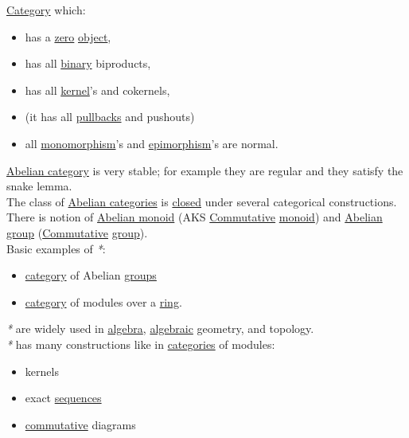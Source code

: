 \documentclass[a4paper,14pt,oneside]{book}
\begin{document}
\hyperref[org3a5c6d7]{Category} which:\\
\begin{itemize}
\item has a \hyperref[org298ecfc]{zero} \hyperref[org65d2cb0]{object},\\
\item has all \hyperref[orga442c45]{binary} biproducts,\\
\item has all \hyperref[org819b772]{kernel}'s and cokernels,\\
\item (it has all \hyperref[orgbe618a5]{pullbacks} and pushouts)\\
\item all \hyperref[orgc0276f0]{monomorphism}'s and \hyperref[orge1e4bc2]{epimorphism}'s are normal.\\
\end{itemize}
\hyperref[orge656738]{Abelian category} is very stable; for example they are regular and they satisfy the snake lemma.\\
The class of \hyperref[org71e0ade]{Abelian categories} is \hyperref[org194c6d7]{closed} under several categorical constructions.\\

There is notion of \hyperref[orgc1b3df5]{Abelian monoid} (AKS \hyperref[orgabd5599]{Commutative} \hyperref[orgd7ec4ef]{monoid}) and \hyperref[orgcf4dbad]{Abelian group} (\hyperref[orgabd5599]{Commutative} \hyperref[orgc28d1c1]{group}).\\

Basic examples of \emph{*}:\\
\begin{itemize}
\item \hyperref[org3a5c6d7]{category} of Abelian \hyperref[org1b6defd]{groups}\\
\item \hyperref[org3a5c6d7]{category} of modules over a \hyperref[org01add56]{ring}.\\
\end{itemize}

\emph{*} are widely used in \hyperref[orgf52fcf3]{algebra}, \hyperref[orgb6b24df]{algebraic} geometry, and topology.\\

\emph{*} has many constructions like in \hyperref[orgc08c4ac]{categories} of modules:\\
\begin{itemize}
\item kernels\\
\item exact \hyperref[org647b286]{sequences}\\
\item \hyperref[orgabd5599]{commutative} diagrams\\
\end{itemize}
\end{document}
